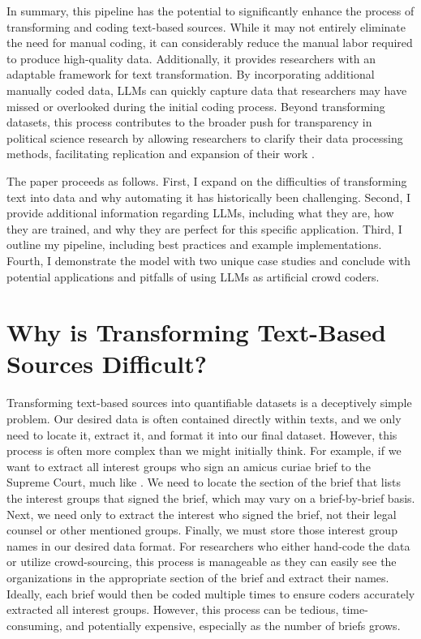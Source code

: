     In summary, this pipeline has the potential to significantly enhance the process of transforming and coding text-based sources. While it may not entirely eliminate the need for manual coding, it can considerably reduce the manual labor required to produce high-quality data. Additionally, it provides researchers with an adaptable framework for text transformation. By incorporating additional manually coded data, LLMs can quickly capture data that researchers may have missed or overlooked during the initial coding process. Beyond transforming datasets, this process contributes to the broader push for transparency in political science research by allowing researchers to clarify their data processing methods, facilitating replication and expansion of their work \citep{gaikwadTransparencyTextBasedSources2023}.

    The paper proceeds as follows. First, I expand on the difficulties of transforming text into data and why automating it has historically been challenging. Second, I provide additional information regarding LLMs, including what they are, how they are trained, and why they are perfect for this specific application. Third, I outline my pipeline, including best practices and example implementations. Fourth, I demonstrate the model with two unique case studies and conclude with potential applications and pitfalls of using LLMs as artificial crowd coders.

    \section{Why is Transforming Text-Based Sources Difficult?}
    
    Transforming text-based sources into quantifiable datasets is a deceptively simple problem. Our desired data is often contained directly within texts, and we only need to locate it, extract it, and format it into our final dataset. However, this process is often more complex than we might initially think. For example, if we want to extract all interest groups who sign an amicus curiae brief to the Supreme Court, much like \citet{Box-Steffensmeier:2012d}. We need to locate the section of the brief that lists the interest groups that signed the brief, which may vary on a brief-by-brief basis. Next, we need only to extract the interest who signed the brief, not their legal counsel or other mentioned groups. Finally, we must store those interest group names in our desired data format. For researchers who either hand-code the data or utilize crowd-sourcing, this process is manageable as they can easily see the organizations in the appropriate section of the brief and extract their names. Ideally, each brief would then be coded multiple times to ensure coders accurately extracted all interest groups. However, this process can be tedious, time-consuming, and potentially expensive, especially as the number of briefs grows.

